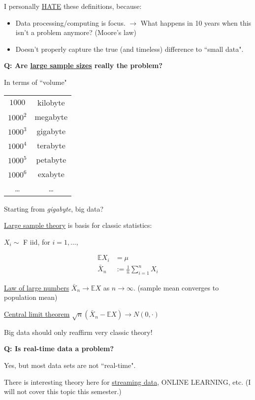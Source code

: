 \documentclass[twoside]{article}
\newcommand*\mean[1]{\bar{#1}}
\begin{document}
I personally \underline{HATE} these definitions, because:
\begin{itemize}
	\item Data processing/computing is focus. $\rightarrow$ What happens in 10 years when this isn't a problem anymore? (Moore's law)
	\item Doesn't properly capture the true (and timeless) difference to ``small data".
\end{itemize}

\textbf{Q: Are \underline{large sample sizes} really the problem?}

In terms of ``volume"

\begin{center}
\begin{tabular}{ c c }
 $1000$ & kilobyte \\ 
 $1000^2$ & megabyte \\  
 $1000^3$ & gigabyte \\
 $1000^4$ & terabyte \\
 $1000^5$ & petabyte \\
 $1000^6$ & exabyte \\
 \dots & \dots
\end{tabular}
\end{center}

Starting from \emph{gigabyte}, big data?

\underline{Large sample theory} is basis for classic statistics:

$X_i\sim$ F iid, for $i=1,\dots$,

\begin{equation}
\begin{split}
	\mathbb{E}X_i&=\mu \\
	\mean{X}_n&:=\frac1n\sum^n_{i=1}X_i
\end{split}	
\end{equation}

\underline{Law of large numbers} $\mean{X}_n\longrightarrow\mathbb{E}X$ as $n\longrightarrow \infty$. (sample mean converges to population mean)

\underline{Central limit theorem} $\sqrt{n}(\mean{X}_n-\mathbb{E}X)\longrightarrow N(0, \cdot)$

Big data should only reaffirm very classic theory!

\textbf{Q: Is real-time data a problem?}

Yes, but most data sets are not ``real-time".

There is interesting theory here for \underline{streaming data}, ONLINE LEARNING, etc. (I will not cover this topic this semester.)
\end{document}
